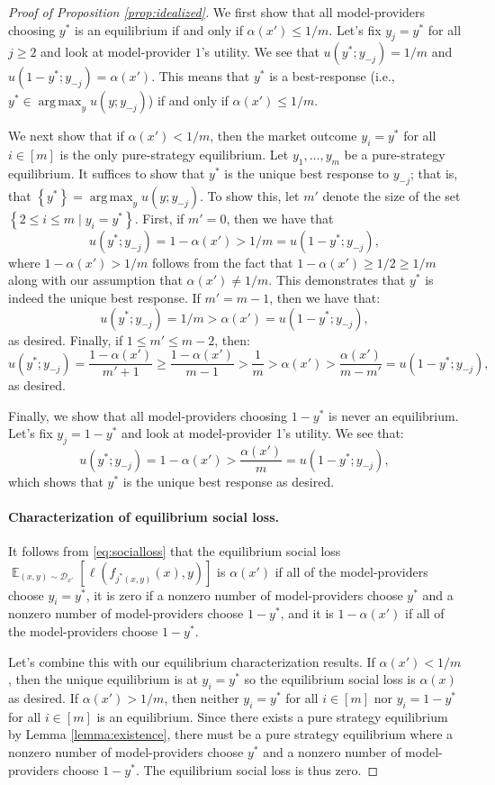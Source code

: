 \documentclass[letterpaper,11pt]{article}
\theoremstyle{plain}
\DeclareMathOperator*{\argmax}{arg\,max}
\DeclareMathOperator*{\E}{\mathbb{E}}
\begin{document}
\begin{proof}[Proof of Proposition \ref{prop:idealized}]
We first show that all model-providers choosing $y^*$ is an equilibrium if and only if $\alpha(x') \le 1/m$. Let's fix $y_j = y^*$ for all $j \ge 2$ and look at model-provider $1$'s utility. We see that $u(y^*; y_{-j}) = 1/m$ and $u(1-y^*; y_{-j}) = \alpha(x')$. This means that $y^*$ is a best-response (i.e., $y^* \in \argmax_y u(y; y_{-j})$) if and only if $\alpha(x') \le 1/m$. 

We next show that if $\alpha(x') < 1/m$, then the market outcome $y_i = y^*$ for all $i \in [m]$ is the only pure-strategy equilibrium. Let $y_1, \ldots, y_m$ be a pure-strategy equilibrium. It suffices to show that $y^*$ is the unique best response to $y_{-j}$; that is, that $\left\{y^*\right\} = \argmax_y u(y; y_{-j})$. To show this, let $m'$ denote the size of the set $\left\{2 \le i \le m \mid y_i = y^*\right\}$. First, if $m' = 0$, then we have that
\[u(y^*; y_{-j}) = 1 - \alpha(x') > 1/m = u(1 - y^*; y_{-j}),  \]
where $1- \alpha(x') > 1/m$ follows from the fact that $1 - \alpha(x') \ge 1/2 \ge 1/m$ along with our assumption that $\alpha(x') \neq 1/m$. This demonstrates that $y^*$ is indeed the unique best response. If $m' = m -1$, then we have that:
\[u(y^*; y_{-j}) = 1/m > \alpha(x') = u(1 - y^*; y_{-j}),  \] as desired. Finally, if $1 \le m' \le m-2$, then:
\[ u(y^*; y_{-j}) = \frac{1-\alpha(x')}{m' + 1} \ge \frac{1-\alpha(x')}{m-1} > \frac{1}{m} > \alpha(x') > \frac{\alpha(x')}{m - m'} = u(1-y^*; y_{-j}), \]
as desired. 

Finally, we show that all model-providers choosing $1-y^*$ is never an equilibrium. Let's fix $y_j = 1 - y^*$ and look at model-provider 1's utility. We see that:
\[ u(y^*; y_{-j}) = 1 - \alpha(x') > \frac{ \alpha(x')}{m} =u(1-y^*; y_{-j}), \]
which shows that $y^*$ is the unique best response as desired.


\paragraph{Characterization of equilibrium social loss.} It follows from \eqref{eq:socialloss} that the equilibrium social loss $\E_{(x,y) \sim \mathcal{D}_{x'}}[\ell(f_{j^*(x,y)}(x), y)]$ is $\alpha(x')$ if all of the model-providers choose $y_i = y^*$, it is zero if a nonzero number of model-providers choose $y^*$ and a nonzero number of model-providers choose $1-y^*$, and it is $1-\alpha(x')$ if all of the model-providers choose $1- y^*$.

Let's combine this with our equilibrium characterization results. If $\alpha(x') < 1/m$, then the unique equilibrium is at $y_i = y^*$ so the equilibrium social loss is $\alpha(x)$ as desired. If $\alpha(x') > 1/m$, then neither $y_i = y^*$ for all $i \in [m]$ nor $y_i = 1- y^*$ for all $i \in [m]$ is an equilibrium. Since there exists a pure strategy equilibrium by Lemma \ref{lemma:existence}, there must be a pure strategy equilibrium where a nonzero number of model-providers choose $y^*$ and a nonzero number of model-providers choose $1-y^*$. The equilibrium social loss is thus zero. 


\end{proof}
\end{document}
